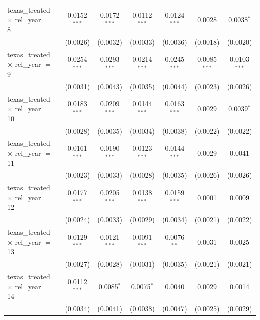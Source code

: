 \begin{tabular}{lcccccc}
   texas\_treated $\times$ rel\_year $=$ 8      & 0.0152$^{***}$ & 0.0172$^{***}$ & 0.0112$^{***}$ & 0.0124$^{***}$ & 0.0028          & 0.0038$^{*}$\\   
                                                & (0.0026)       & (0.0032)       & (0.0033)       & (0.0036)       & (0.0018)        & (0.0020)\\   
   texas\_treated $\times$ rel\_year $=$ 9      & 0.0254$^{***}$ & 0.0293$^{***}$ & 0.0214$^{***}$ & 0.0245$^{***}$ & 0.0085$^{***}$  & 0.0103$^{***}$\\   
                                                & (0.0031)       & (0.0043)       & (0.0035)       & (0.0044)       & (0.0023)        & (0.0026)\\   
   texas\_treated $\times$ rel\_year $=$ 10     & 0.0183$^{***}$ & 0.0209$^{***}$ & 0.0144$^{***}$ & 0.0163$^{***}$ & 0.0029          & 0.0039$^{*}$\\   
                                                & (0.0028)       & (0.0035)       & (0.0034)       & (0.0038)       & (0.0022)        & (0.0022)\\   
   texas\_treated $\times$ rel\_year $=$ 11     & 0.0161$^{***}$ & 0.0190$^{***}$ & 0.0123$^{***}$ & 0.0144$^{***}$ & 0.0029          & 0.0041\\   
                                                & (0.0023)       & (0.0033)       & (0.0028)       & (0.0035)       & (0.0026)        & (0.0026)\\   
   texas\_treated $\times$ rel\_year $=$ 12     & 0.0177$^{***}$ & 0.0205$^{***}$ & 0.0138$^{***}$ & 0.0159$^{***}$ & 0.0001          & 0.0009\\   
                                                & (0.0024)       & (0.0033)       & (0.0029)       & (0.0034)       & (0.0021)        & (0.0022)\\   
   texas\_treated $\times$ rel\_year $=$ 13     & 0.0129$^{***}$ & 0.0121$^{***}$ & 0.0091$^{***}$ & 0.0076$^{**}$  & 0.0031          & 0.0025\\   
                                                & (0.0027)       & (0.0028)       & (0.0031)       & (0.0035)       & (0.0021)        & (0.0021)\\   
   texas\_treated $\times$ rel\_year $=$ 14     & 0.0112$^{***}$ & 0.0085$^{*}$   & 0.0075$^{*}$   & 0.0040         & 0.0029          & 0.0014\\   
                                                & (0.0034)       & (0.0041)       & (0.0038)       & (0.0047)       & (0.0025)        & (0.0029)\\   

\end{tabular}
